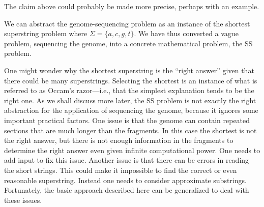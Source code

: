 \begin{cluster}
\label{grp:tch:genome::claim}

\begin{teachnote}
\label{tch:genome::claim}
The claim above could probably be made more precise, perhaps with an
example.

\end{teachnote}
\end{cluster}

\begin{cluster}
\label{grp:grm:genome::abstract}

\begin{gram}
\label{grm:genome::abstract}
We can abstract the genome-sequencing problem as an instance of the
shortest superstring problem where $\Sigma = \{a, c, g, t\}$.
We have thus converted a vague problem, sequencing the genome, into a
concrete mathematical problem, the SS problem. 

\end{gram}
\end{cluster}

\begin{cluster}
\label{grp:rmrk:genome::might}

\begin{remark}
\label{rmrk:genome::might}
  One might wonder why the shortest superstring is the ``right  
  answer'' given that there could be many superstrings.  Selecting the  
  shortest is an instance of what is referred to as Occam's razor---i.e.,
  that the simplest explanation tends to be the right one. 
As we shall discuss more later, the SS problem is not exactly the
right abstraction for the application of sequencing the genome,
because it ignores some important practical factors.
One issue is that the genome can contain repeated sections that are 
much longer than the fragments.
In this case the shortest is not the right answer, but there is not
enough information in the fragments to determine the right answer
even given infinite computational power.
One needs to add input to fix this issue.
Another issue is that there can be errors in reading the short
strings.  This could make it impossible to find the correct or even
reasonable superstring.    Instead one needs to consider
approximate substrings.
Fortunately, the basic approach described here can be generalized to
deal with these issues.

\end{remark}
\end{cluster}


